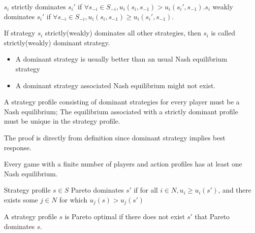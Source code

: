 \begin{refsection}
\begin{definition}[dominance ]
\cite[20]{leyton2008essentials}
$s_i$ strictly dominates $s_i'$ if $\forall s_{-i}\in S_{-i}, u_i(s_i,s_{-1}) > u_i(s_i',s_{-1})$.$s_i$ weakly dominates $s_i'$ if $\forall s_{-i}\in S_{-i}, u_i(s_i,s_{-1}) \geq u_i(s_i',s_{-1})$.  
\end{definition}

\begin{definition}
If strategy $s_i$ strictly(weakly) dominates all other strategies, then $s_i$ is called strictly(weakly) dominant strategy.
\end{definition}

\begin{remark}\hfill
\begin{itemize}
    \item A dominant strategy is usually better than an usual Nash equilibrium strategy
    \item A dominant strategy associated Nash equilibrium might not exist.
\end{itemize}
\end{remark}

\begin{theorem}
A strategy profile consisting of dominant strategies for every player must be a Nash equilibrium; The equilibrium associated with a strictly dominant profile must be unique in the strategy profile.
\end{theorem}

\begin{remark}
The proof is directly from definition since dominant strategy implies best response.
\end{remark}


\begin{theorem}\label{ch:game-theory:th:existenceNashEquilibriumFinitePlayerMixedStrategy}
Every game with a finite number of players and action profiles has at least one Nash equilibrium.
\end{theorem}

\begin{definition}
\cite[10]{leyton2008essentials} Strategy profile $s\in S$ Pareto dominates $s'$ if for all $i\in N, u_i \geq u_i(s')$, and there exists some $j\in N$ for which $u_j(s) > u_j(s')$
\end{definition}

\begin{definition}
\cite[10]{leyton2008essentials}
A strategy profile $s$ is Pareto optimal if there does not exist $s'$ that Pareto dominates $s$.
\end{definition}


\end{refsection}
